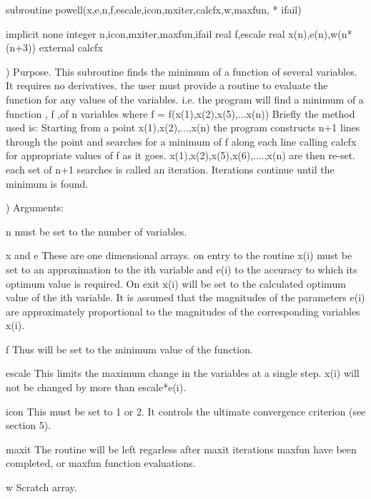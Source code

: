 \par{\tenpoint
{\eightpoint\begintt
      subroutine powell(x,e,n,f,escale,icon,mxiter,calcfx,w,maxfun,
     *                                                          ifail)

      implicit none
      integer n,icon,mxiter,maxfun,ifail
      real f,escale
      real x(n),e(n),w(n*(n+3))
      external calcfx
\endtt}
{\eightpoint{}) Purpose.
  This subroutine finds the minimum of a function of several
  variables. It requires no derivatives. the user must provide a
  routine to evaluate the function for any values of the variables.
  i.e. the program will find a minimum of a function , f ,of n
  variables where
            f = f(x(1),x(2),x(5),...x(n))
\endtt}
{\eightpoint\begintt
  Briefly the method used is:
  Starting from a point x(1),x(2),...,x(n) the program constructs
  n+1 lines through the point and searches for a minimum of f along
  each line calling calcfx for appropriate values of f as it goes.
  x(1),x(2),x(5),x(6),....,x(n) are then re-set.   each set of n+1
  searches is called an iteration. Iterations continue until the
  minimum is found.
\endtt}
{\eightpoint{}) Arguments:

    n          must be set to the number of variables.

    x and e    These are one dimensional arrays. on entry to the routine
               x(i) must be set to an approximation to the ith variable
               and e(i) to the accuracy to which its optimum value is
               required. On exit x(i) will be set to the calculated optimum
               value of the ith variable. It is assumed that the magnitudes
               of the parameters e(i) are approximately proportional to
               the magnitudes of the corresponding variables x(i).

    f          Thus will be set to the minimum value of the function.

    escale     This limits the maximum change in the variables at a single
               step.  x(i) will not be changed by more than escale*e(i).

    icon       This must be set to 1 or 2. It controls the ultimate
               convergence criterion (see section 5).

    maxit      The routine will be left regarless after maxit iterations 
    maxfun     have been completed, or maxfun function evaluations.

    w          Scratch array.

}}
